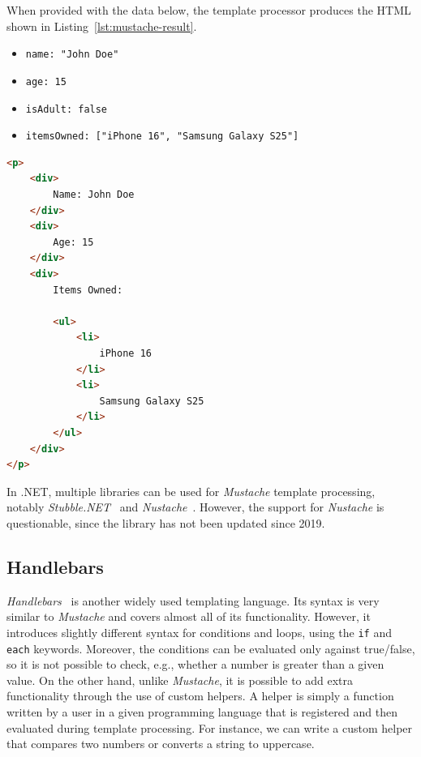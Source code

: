 When provided with the data below, the template processor produces the HTML shown in Listing~\ref{lst:mustache-result}.

\begin{itemize}
  \item \texttt{name: "John Doe"}
  \item \texttt{age: 15}
  \item \texttt{isAdult: false}
  \item \texttt{itemsOwned: ["iPhone 16", "Samsung Galaxy S25"]}
\end{itemize}

\begin{listing}[H]
\begin{lstlisting}[language=HTML]
<p>
    <div>
        Name: John Doe
    </div>
    <div>
        Age: 15
    </div>
    <div>
        Items Owned:

        <ul>
            <li>
                iPhone 16
            </li>
            <li>
                Samsung Galaxy S25
            </li>
        </ul>
    </div>
</p>
\end{lstlisting}
\caption{Example \textit{Mustache} template output}
\label{lst:mustache-result}
\end{listing}

In .NET, multiple libraries can be used for \textit{Mustache} template processing, notably \textit{Stubble.NET}~\cite{stubble} and \textit{Nustache}~\cite{nustache}.
However, the support for \textit{Nustache} is questionable, since the library has not been updated since 2019.

\subsection{Handlebars}

\textit{Handlebars}~\cite{handlebars} is another widely used templating language.
Its syntax is very similar to \textit{Mustache} and covers almost all of its functionality.
However, it introduces slightly different syntax for conditions and loops, using the \texttt{if} and \texttt{each} keywords.
Moreover, the conditions can be evaluated only against true/false, so it is not possible to check, e.g., whether a number is greater than a given value.
On the other hand, unlike \textit{Mustache}, it is possible to add extra functionality through the use of custom helpers.
A helper is simply a function written by a user in a given programming language that is registered and then evaluated during template processing.
For instance, we can write a custom helper that compares two numbers or converts a string to uppercase.

